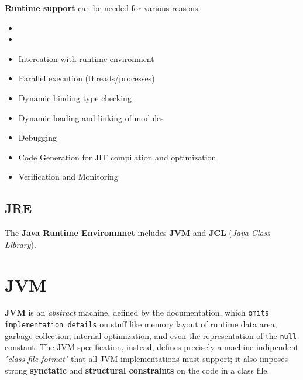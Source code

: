 \textbf{Runtime support} can be needed for various reasons:
\begin{itemize}
    \item %
    \item {}
    \item Intercation with runtime environment
    \item Parallel execution (threads/processes)
    \item Dynamic binding type checking
    \item Dynamic loading and linking of modules
    \item Debugging
    \item Code Generation for JIT compilation and optimization
    \item Verification and Monitoring
\end{itemize}

\subsection{JRE}
The \textbf{Java Runtime Environmnet} includes \textbf{JVM} and \textbf{JCL} (\textit{Java Class Library}).

\section{JVM}
\textbf{JVM} is an \textit{abstract} machine, defined by the documentation,
which \texttt{omits implementation details} on stuff like memory layout of runtime data area, garbage-collection, internal optimization, and even the representation of the \lstinline{null} constant.
The JVM specification, instead, defines precisely a machine indipendent \textit{"class file format"} that all JVM implementations must support;
it also imposes strong \textbf{synctatic} and \textbf{structural constraints} on the code in a class file.
\nl

